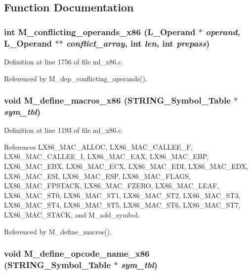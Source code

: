 \subsection{Function Documentation}
\subsubsection{\setlength{\rightskip}{0pt plus 5cm}int M\_\-conflicting\_\-operands\_\-x86 (L\_\-Operand $\ast$ {\em operand}, L\_\-Operand $\ast$$\ast$ {\em conflict\_\-array}, int {\em len}, int {\em prepass})}\label{ml__x86_8c_0c7d08aa0ec4542131f0971a87ba2876}




Definition at line 1756 of file ml\_\-x86.c.

Referenced by M\_\-dep\_\-conflicting\_\-operands().
\subsubsection{\setlength{\rightskip}{0pt plus 5cm}void M\_\-define\_\-macros\_\-x86 (\bf{STRING\_\-Symbol\_\-Table} $\ast$ {\em sym\_\-tbl})}\label{ml__x86_8c_1f354096fc2141fa3c80525dffdf5ca5}




Definition at line 1193 of file ml\_\-x86.c.

References LX86\_\-MAC\_\-ALLOC, LX86\_\-MAC\_\-CALLEE\_\-F, LX86\_\-MAC\_\-CALLEE\_\-I, LX86\_\-MAC\_\-EAX, LX86\_\-MAC\_\-EBP, LX86\_\-MAC\_\-EBX, LX86\_\-MAC\_\-ECX, LX86\_\-MAC\_\-EDI, LX86\_\-MAC\_\-EDX, LX86\_\-MAC\_\-ESI, LX86\_\-MAC\_\-ESP, LX86\_\-MAC\_\-FLAGS, LX86\_\-MAC\_\-FPSTACK, LX86\_\-MAC\_\-FZERO, LX86\_\-MAC\_\-LEAF, LX86\_\-MAC\_\-ST0, LX86\_\-MAC\_\-ST1, LX86\_\-MAC\_\-ST2, LX86\_\-MAC\_\-ST3, LX86\_\-MAC\_\-ST4, LX86\_\-MAC\_\-ST5, LX86\_\-MAC\_\-ST6, LX86\_\-MAC\_\-ST7, LX86\_\-MAC\_\-STACK, and M\_\-add\_\-symbol.

Referenced by M\_\-define\_\-macros().
\subsubsection{\setlength{\rightskip}{0pt plus 5cm}void M\_\-define\_\-opcode\_\-name\_\-x86 (\bf{STRING\_\-Symbol\_\-Table} $\ast$ {\em sym\_\-tbl})}\label{ml__x86_8c_e7257eb4b2496a55ddf175459e8ecda0}




